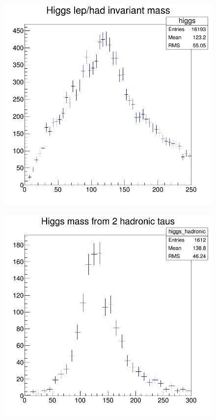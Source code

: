 \documentclass[12pt]{article}
\begin{document}
		 \begin{figure}[h]
		 	\centering
		 	\includegraphics[scale=.36]{lep_had.png}
		 \end{figure}
			 \begin{figure}[h]
			 	\centering
			 	\includegraphics[scale=.31]{hadronic.png}
			 \end{figure}
\end{document}

